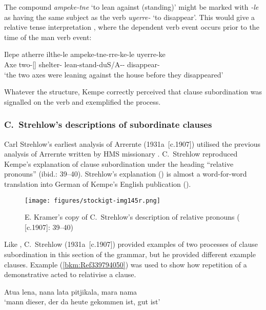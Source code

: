 The compound \textit{ampeke-tne} `to lean against (standing)' might be marked with \textit{-le} as having the same subject as the verb \textit{uyerre-} `to disappear'. This would give a relative tense interpretation \citep[462]{wilkins_mparntwe_1989}, where the dependent verb event occurs prior to the time of the man verb event:

\ea
\gll  Ilepe   atherre             ilthe-le         ampeke-tne-rre-ke-le               uyerre-ke\\
Axe    two-[]       shelter-    lean-stand-duS/A{}--      disappear-\\
\glt `the two axes were leaning against the house before they disappeared'
\z


Whatever the structure, Kempe correctly perceived that clause subordination was signalled on the verb and exemplified the process.

\subsubsection{C.~Strehlow’s descriptions of subordinate clauses}
\label{sec:key:9.3.5.2}\label{bkm:Ref516470592}

Carl Strehlow’s earliest analysis of Arrernte (1931a~[c.1907]) utilised the previous analysis of Arrernte written by HMS missionary \citet{kempe_grammar_1891}. C.~Strehlow reproduced Kempe’s explanation of clause subordination under the heading “relative pronouns” (ibid.: 39--40). Strehlow’s explanation () is almost a word-for-word translation into German of Kempe’s English publication ().

\begin{figure}
\texttt{[image: figures/stockigt-img145r.png]}
\caption{E. Kramer’s copy of C.~Strehlow’s description of relative pronouns (\citeyear{strehlow_untitled_1931} [c.1907]: 39--40)}
\label{bkm:Ref339787839}
\label{fig:key:199}
\end{figure}

Like \citet{Kempe1891}, C.~Strehlow (1931a~[c.1907]) provided examples of two processes of clause subordination in this section of the grammar, but he provided different example clauses. Example (\ref{bkm:Ref339794050}) was used to show how repetition of a demonstrative acted to relativise a clause.

\ea
\label{bkm:Ref339794050}Atua       lena,                    nana              lata               pitjikala,          mara       nama\\
\glt `mann dieser, der da heute gekommen ist, gut ist'


